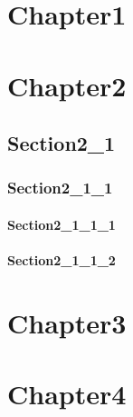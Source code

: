 \chapter{Chapter1}
\chapter{Chapter2}
\section{Section2_1}
\subsection{Section2_1_1}
\subsubsection{Section2_1_1_1}
\lipsum
\subsubsection{Section2_1_1_2}
\lipsum
\chapter{Chapter3}
\lipsum
\chapter{Chapter4}
\lipsum
